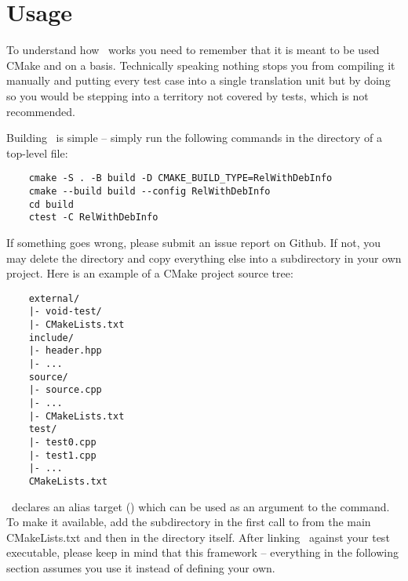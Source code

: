 \section{Usage}

To understand how \voidtest\ works you need to remember that it is meant to be used 
CMake and on a  basis. Technically speaking nothing stops you from
compiling it manually and putting every test case into a single translation unit but by doing so
you would be stepping into a territory not covered by tests, which is not recommended. \par
Building \voidtest\ is simple -- simply run the following commands in the directory of a top-level
 file:
\begin{verbatim}
    cmake -S . -B build -D CMAKE_BUILD_TYPE=RelWithDebInfo
    cmake --build build --config RelWithDebInfo
    cd build
    ctest -C RelWithDebInfo
\end{verbatim}
If something goes wrong, please submit an issue report on Github. If not, you may delete
the  directory and copy everything else into a subdirectory in your own project.
Here is an example of a CMake project source tree:
\begin{verbatim}
    external/
    |- void-test/
    |- CMakeLists.txt
    include/
    |- header.hpp
    |- ...
    source/
    |- source.cpp
    |- ...
    |- CMakeLists.txt
    test/
    |- test0.cpp
    |- test1.cpp
    |- ...
    CMakeLists.txt
\end{verbatim}
\voidtest\ declares an alias target () which can be used as
an argument to the  command. To make it available, add the
 subdirectory in the first call to  from the
main {CMakeLists.txt} and then  in the 
directory itself. After linking \voidtest\ against your test executable, please keep in mind that
this framework  -- everything in the following section assumes
you use it instead of defining your own.
